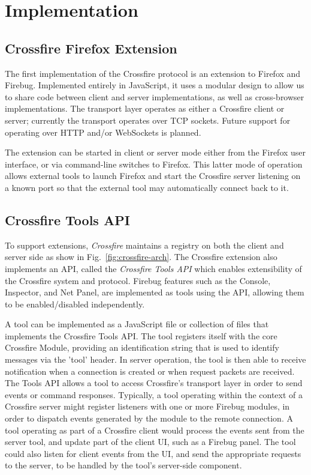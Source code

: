 \section{Implementation}
\subsection{Crossfire Firefox Extension}
The first implementation of the Crossfire protocol is an extension to Firefox
and Firebug. Implemented entirely in JavaScript, it uses a modular design to
allow us to share code between client and server implementations, as well as
cross-browser implementations. The transport layer operates as either a Crossfire
client or server; currently the transport operates over TCP sockets.
Future support for operating over HTTP and/or WebSockets is planned.

The extension can be started in client or server mode either from the Firefox
user interface, or via command-line switches to Firefox. This latter mode of
operation allows external tools to launch Firefox and start the Crossfire server
listening on a known port so that the external tool may automatically connect
back to it.

\subsection{Crossfire Tools API}
To support extensions, \textit{Crossfire} maintains a registry on both the
client and server side as show in Fig.~\ref{fig:crossfire-arch}.
The Crossfire extension also implements an API, called the \textit{Crossfire
Tools API} which enables extensibility of the Crossfire system and protocol.
Firebug features such as the Console, Inspector, and Net Panel, are implemented as tools
using the API, allowing them to be enabled/disabled independently.

A tool can be implemented as a JavaScript file or collection of files that
implements the Crossfire Tools API. The tool registers itself with the core
Crossfire Module, providing an identification string that is used to identify
messages via the 'tool' header. In server operation, the tool is then able to
receive notification when a connection is created or when request packets are
received. The Tools API allows a tool to access Crossfire's transport layer in
order to send events or command responses.  Typically, a tool operating within
the context of a Crossfire server might register listeners with one or more
Firebug modules, in order to dispatch events generated by the module to the
remote connection. A tool operating as part of a Crossfire client would process
the events sent from the server tool, and update part of the client UI, such as
a Firebug panel. The tool could also listen for client events from the UI, and
send the appropriate requests to the server, to be handled by the tool's
server-side component.

